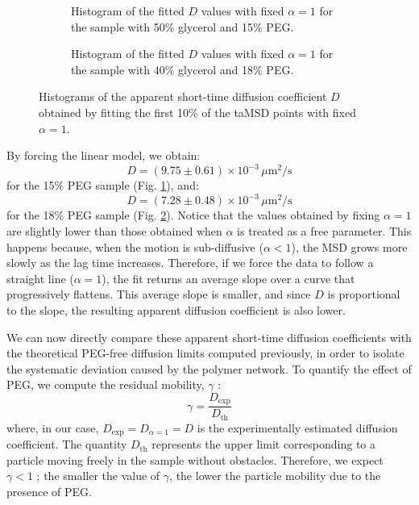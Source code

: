 \begin{figure}[!htbp]
    \centering
    \begin{subfigure}[t]{0.45\textwidth}
        \centering
        
        \caption{Histogram of the fitted $D$ values with fixed $\alpha = 1$ for the sample with 50\% glycerol and 15\% PEG.}
        \label{fig:Hist_D_linear_b}
    \end{subfigure}
    \hfill
    \begin{subfigure}[t]{0.45\textwidth}
        \centering
        
        \caption{Histogram of the fitted $D$ values with fixed $\alpha = 1$ for the sample with 40\% glycerol and 18\% PEG.}
        \label{fig:Hist_D_linear_a}
    \end{subfigure}

    \caption{Histograms of the apparent short-time diffusion coefficient $D$ obtained by fitting the first 10\% of the taMSD points with fixed $\alpha = 1$.}
    \label{fig:D_linear_histograms_anomalous_samples}
\end{figure}

By forcing the linear model, we obtain: $$D = (9.75 \pm 0.61) \times 10^{-3}\,\mu\mathrm{m}^2/\mathrm{s}$$ for the 15\% PEG sample (Fig. \ref{fig:Hist_D_linear_b}), and: $$D = (7.28 \pm 0.48) \times 10^{-3}\,\mu\mathrm{m}^2/\mathrm{s}$$ for the 18\% PEG sample (Fig. \ref{fig:Hist_D_linear_a}). 
Notice that the values obtained by fixing $\alpha = 1$ are slightly lower than those obtained when $\alpha$ is treated as a free parameter. This happens because, when the motion is sub-diffusive ($\alpha < 1$), the MSD grows more slowly as the lag time increases. Therefore, if we force the data to follow a straight line ($\alpha = 1$), the fit returns an average slope over a curve that progressively flattens. This average slope is smaller, and since $D$ is proportional to the slope, the resulting apparent diffusion coefficient is also lower.

We can now directly compare these apparent short-time diffusion coefficients with the theoretical PEG-free diffusion limits computed previously, in order to isolate the systematic deviation caused by the polymer network. To quantify the effect of PEG, we compute the residual mobility, $\gamma$ \cite{doi:10.1021/acs.langmuir.7b03418, ijms241311148}:
\begin{equation}\label{eq:diffusion_coefficient_ratio}
    \gamma = \frac{D_{\mathrm{exp}}}{D_{\mathrm{th}}}
\end{equation}
where, in our case, $D_{\mathrm{exp}} = D_{\alpha = 1} = D$ is the experimentally estimated diffusion coefficient.
The quantity $D_{\mathrm{th}}$ represents the upper limit corresponding to a particle moving freely in the sample without obstacles. Therefore, we expect $\gamma < 1$ \cite{doi:10.1021/acs.langmuir.7b03418}; the smaller the value of $\gamma$, the lower the particle mobility due to the presence of PEG.

